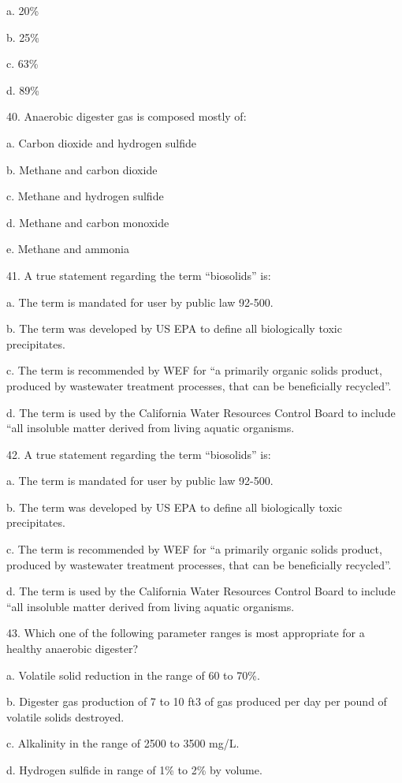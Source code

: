 \documentclass{article}
\begin{document}
a. 20\% 

b. 25\% 

c. 63\% 

d. 89\% 


40. Anaerobic digester gas is composed mostly of: 

a. Carbon dioxide and hydrogen sulfide 

b. Methane and carbon dioxide 

c. Methane and hydrogen sulfide 

d. Methane and carbon monoxide 

e. Methane and ammonia 


41. A true statement regarding the term “biosolids” is: 

a. The term is mandated for user by public law 92-500. 

b. The term was developed by US EPA to define all biologically toxic precipitates. 

c. The term is recommended by WEF for “a primarily organic solids product, produced by wastewater treatment processes, that can be beneficially recycled”. 

d. The term is used by the California Water Resources Control Board to include “all insoluble matter derived from living aquatic organisms. 


42. A true statement regarding the term “biosolids” is: 

a. The term is mandated for user by public law 92-500. 

b. The term was developed by US EPA to define all biologically toxic precipitates. 

c. The term is recommended by WEF for “a primarily organic solids product, produced by wastewater treatment processes, that can be beneficially recycled”. 

d. The term is used by the California Water Resources Control Board to include “all insoluble matter derived from living aquatic organisms. 


43. Which one of the following parameter ranges is most appropriate for a healthy anaerobic digester? 

a. Volatile solid reduction in the range of 60 to 70\%. 

b. Digester gas production of 7 to 10 ft3 of gas produced per day per pound of volatile solids destroyed. 

c. Alkalinity in the range of 2500 to 3500 mg/L. 

d. Hydrogen sulfide in range of 1\% to 2\% by volume. 
\end{document}
